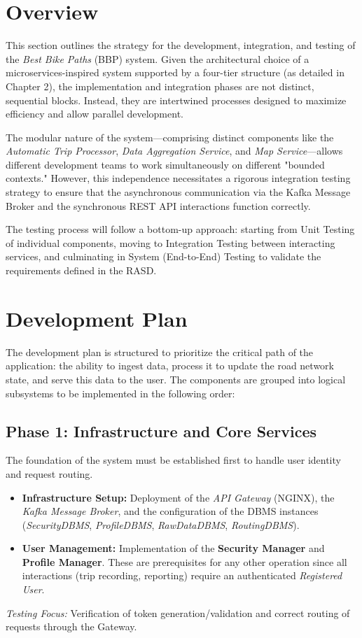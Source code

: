 \section{Overview}
This section outlines the strategy for the development, integration, and testing of the \textit{Best Bike Paths} (BBP) system. 
Given the architectural choice of a microservices-inspired system supported by a four-tier structure (as detailed in Chapter 2), the implementation and integration phases are not distinct, sequential blocks. Instead, they are intertwined processes designed to maximize efficiency and allow parallel development.

The modular nature of the system—comprising distinct components like the \textit{Automatic Trip Processor}, \textit{Data Aggregation Service}, and \textit{Map Service}—allows different development teams to work simultaneously on different "bounded contexts." However, this independence necessitates a rigorous integration testing strategy to ensure that the asynchronous communication via the Kafka Message Broker and the synchronous REST API interactions function correctly.

The testing process will follow a bottom-up approach: starting from Unit Testing of individual components, moving to Integration Testing between interacting services, and culminating in System (End-to-End) Testing to validate the requirements defined in the RASD.

\section{Development Plan}
The development plan is structured to prioritize the critical path of the application: the ability to ingest data, process it to update the road network state, and serve this data to the user. The components are grouped into logical subsystems to be implemented in the following order:

\subsection{Phase 1: Infrastructure and Core Services}
The foundation of the system must be established first to handle user identity and request routing.
\begin{itemize}
    \item \textbf{Infrastructure Setup:} Deployment of the \textit{API Gateway} (NGINX), the \textit{Kafka Message Broker}, and the configuration of the DBMS instances (\textit{SecurityDBMS}, \textit{ProfileDBMS}, \textit{RawDataDBMS}, \textit{RoutingDBMS}).
    \item \textbf{User Management:} Implementation of the \textbf{Security Manager} and \textbf{Profile Manager}. These are prerequisites for any other operation since all interactions (trip recording, reporting) require an authenticated \textit{Registered User}.
\end{itemize}
\textit{Testing Focus:} Verification of token generation/validation and correct routing of requests through the Gateway.

